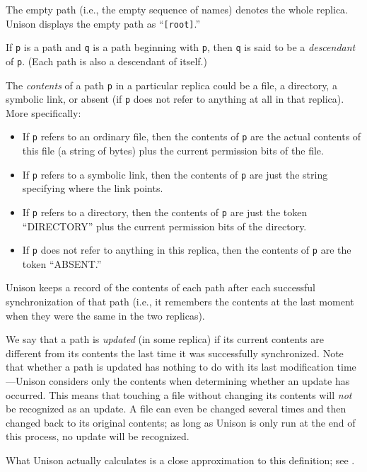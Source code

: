 \documentclass{article}
\begin{document}
The empty path (i.e., the empty sequence of names) denotes the whole
replica.  Unison displays the empty path as ``\verb|[root]|.''

If \verb|p| is a path and \verb|q| is a path beginning with \verb|p|, then
\verb|q| is said to be a {\em descendant} of \verb|p|.  (Each path is also a
descendant of itself.)



The {\em contents} of a path \verb|p| in a particular replica could be a
file, a directory, a symbolic link, or absent (if \verb|p| does not
refer to anything at all in that replica).  More specifically:
\begin{itemize}
\item If \verb|p| refers to an ordinary file, then the
contents of \verb|p| are the actual contents of this file (a string of bytes)
plus the current permission bits of the file.  
\item If \verb|p| refers to a symbolic link, then the contents of \verb|p|
are just the string specifying where the link points.
\item If \verb|p| refers to a directory, then the
contents of \verb|p| are just the token ``DIRECTORY'' plus the current
permission bits of the directory.  
\item If \verb|p| does not refer to anything in this replica, then the
contents of \verb|p| are the token ``ABSENT.''
\end{itemize}
Unison keeps a record of the contents of each path after each
successful synchronization of that path (i.e., it remembers the
contents at the last moment when they were the same in the two
replicas).  

We say that a path is {\em updated} (in some replica) if its current
contents are different from its contents the last time it was successfully
synchronized.  Note that whether a path is updated has nothing to do with
its last modification time---Unison considers only the contents when
determining whether an update has occurred.  This means that touching a file
without changing its contents will {\em not} be recognized as an update.  A
file can even be changed several times and then changed back to its original
contents; as long as Unison is only run at the end of this process, no
update will be recognized.

What Unison actually calculates is a close approximation to this
definition; see .
\end{document}

